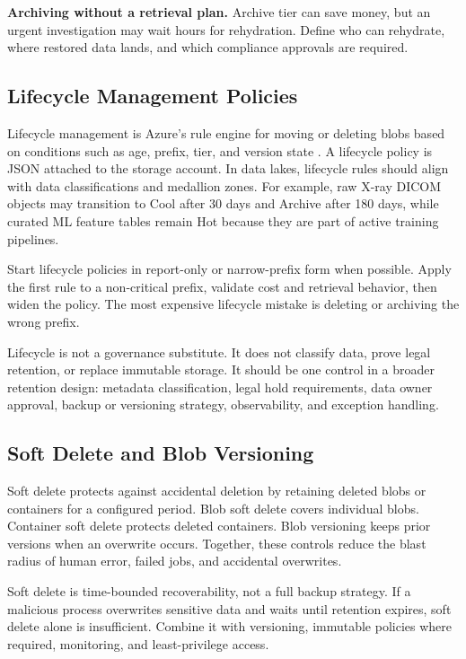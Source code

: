 \begin{pitfall}
\textbf{Archiving without a retrieval plan.} Archive tier can save money, but an urgent investigation may wait hours for rehydration. Define who can rehydrate, where restored data lands, and which compliance approvals are required.
\end{pitfall}

\subsection{Lifecycle Management Policies}
Lifecycle management is Azure's rule engine for moving or deleting blobs based on conditions such as age, prefix, tier, and version state \cite{microsoft2025lifecycle}. A lifecycle policy is JSON attached to the storage account. In data lakes, lifecycle rules should align with data classifications and medallion zones. For example, raw X-ray DICOM objects may transition to Cool after 30 days and Archive after 180 days, while curated ML feature tables remain Hot because they are part of active training pipelines.

\begin{tipbox}
Start lifecycle policies in report-only or narrow-prefix form when possible. Apply the first rule to a non-critical prefix, validate cost and retrieval behavior, then widen the policy. The most expensive lifecycle mistake is deleting or archiving the wrong prefix.
\end{tipbox}

Lifecycle is not a governance substitute. It does not classify data, prove legal retention, or replace immutable storage. It should be one control in a broader retention design: metadata classification, legal hold requirements, data owner approval, backup or versioning strategy, observability, and exception handling.

\subsection{Soft Delete and Blob Versioning}
Soft delete protects against accidental deletion by retaining deleted blobs or containers for a configured period. Blob soft delete covers individual blobs. Container soft delete protects deleted containers. Blob versioning keeps prior versions when an overwrite occurs. Together, these controls reduce the blast radius of human error, failed jobs, and accidental overwrites.

\begin{notebox}
Soft delete is time-bounded recoverability, not a full backup strategy. If a malicious process overwrites sensitive data and waits until retention expires, soft delete alone is insufficient. Combine it with versioning, immutable policies where required, monitoring, and least-privilege access.
\end{notebox}

